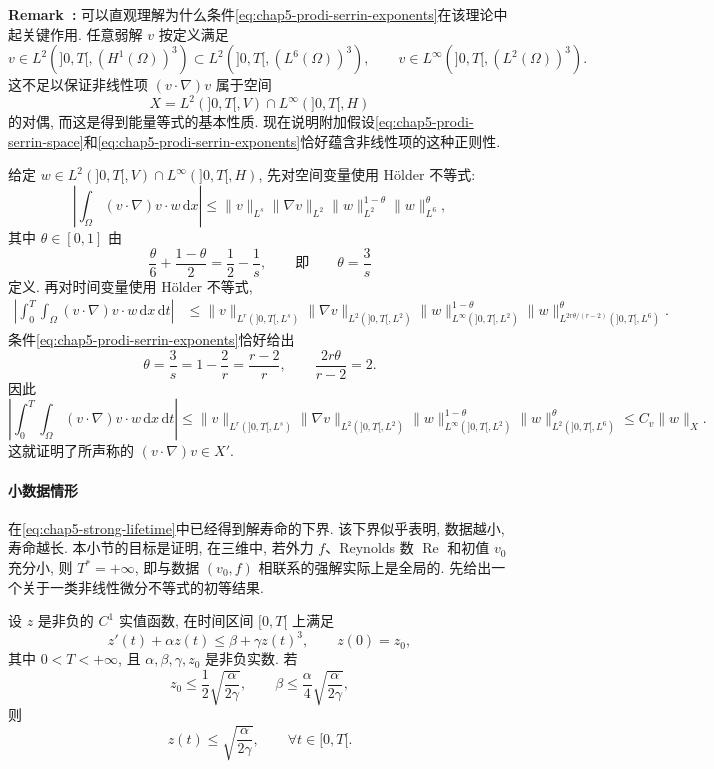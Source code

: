 \par\noindent{}\textbf{Remark~\thechapterfivesectiontworemark:}\label{rem:chap5-prodi-serrin-explanation}
可以直观理解为什么条件\eqref{eq:chap5-prodi-serrin-exponents}在该理论中起关键作用. 任意弱解 $v$ 按定义满足
\[
 v\in L^2(]0,T[,(H^1(\Omega))^3)\subset L^2(]0,T[,(L^6(\Omega))^3),
 \qquad
 v\in L^\infty(]0,T[,(L^2(\Omega))^3).
\]
这不足以保证非线性项 $(v\cdot\nabla)v$ 属于空间
\[
 X=L^2(]0,T[,V)\cap L^\infty(]0,T[,H)
\]
的对偶, 而这是得到能量等式的基本性质. 现在说明附加假设\eqref{eq:chap5-prodi-serrin-space}和\eqref{eq:chap5-prodi-serrin-exponents}恰好蕴含非线性项的这种正则性.

给定 $w\in L^2(]0,T[,V)\cap L^\infty(]0,T[,H)$, 先对空间变量使用 Hölder 不等式:
\[
 \left|\int_\Omega(v\cdot\nabla)v\cdot w\,\mathrm dx\right|
 \leq\|v\|_{L^s}\|\nabla v\|_{L^2}
 \|w\|_{L^2}^{1-\theta}\|w\|_{L^6}^{\theta},
\]
其中 $\theta\in[0,1]$ 由
\[
 \frac\theta6+\frac{1-\theta}2=\frac12-\frac1s,
 \qquad\text{即}\qquad\theta=\frac3s
\]
定义. 再对时间变量使用 Hölder 不等式,
\begin{align*}
 \left|\int_0^T\int_\Omega(v\cdot\nabla)v\cdot w\,\mathrm dx\,\mathrm dt\right|
 &\leq\|v\|_{L^r(]0,T[,L^s)}\|\nabla v\|_{L^2(]0,T[,L^2)}
 \|w\|_{L^\infty(]0,T[,L^2)}^{1-\theta}
 \|w\|_{L^{2r\theta/(r-2)}(]0,T[,L^6)}^\theta.
\end{align*}
条件\eqref{eq:chap5-prodi-serrin-exponents}恰好给出
\[
 \theta=\frac3s=1-\frac2r=\frac{r-2}r,
 \qquad
 \frac{2r\theta}{r-2}=2.
\]
因此
\[
 \left|\int_0^T\int_\Omega(v\cdot\nabla)v\cdot w\,\mathrm dx\,\mathrm dt\right|
 \leq\|v\|_{L^r(]0,T[,L^s)}\|\nabla v\|_{L^2(]0,T[,L^2)}
 \|w\|_{L^\infty(]0,T[,L^2)}^{1-\theta}
 \|w\|_{L^2(]0,T[,L^6)}^\theta
 \leq C_v\|w\|_X.
\]
这就证明了所声称的 $(v\cdot\nabla)v\in X'$.

\paragraph{小数据情形}
\label{subsec:chap5-strong-small-data}

在\eqref{eq:chap5-strong-lifetime}中已经得到解寿命的下界. 该下界似乎表明, 数据越小, 寿命越长. 本小节的目标是证明, 在三维中, 若外力 $f$、Reynolds 数 $\operatorname{Re}$ 和初值 $v_0$ 充分小, 则 $T^*=+\infty$, 即与数据 $(v_0,f)$ 相联系的强解实际上是全局的. 先给出一个关于一类非线性微分不等式的初等结果.

\begin{Lemma}
\label{lem:chap5-nonlinear-small-data}
设 $z$ 是非负的 $C^1$ 实值函数, 在时间区间 $[0,T[$ 上满足
\[
 z'(t)+\alpha z(t)\leq\beta+\gamma z(t)^3,
 \qquad z(0)=z_0,
\]
其中 $0<T<+\infty$, 且 $\alpha,\beta,\gamma,z_0$ 是非负实数. 若
\[
 z_0\leq\frac12\sqrt{\frac\alpha{2\gamma}},
 \qquad
 \beta\leq\frac\alpha4\sqrt{\frac\alpha{2\gamma}},
\]
则
\[
 z(t)\leq\sqrt{\frac\alpha{2\gamma}},
 \qquad\forall t\in[0,T[.
\]
\end{Lemma}

